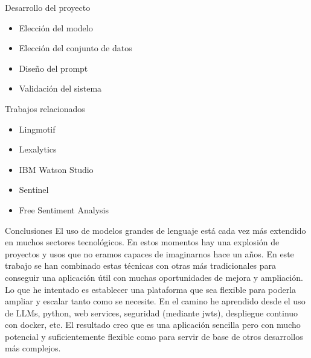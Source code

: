 \documentclass[aspectratio=169,xcolor=dvipsnames, t]{beamer}
\begin{document}
\begin{frame}{Desarrollo del proyecto}
    \begin{itemize}
        \item Elección del modelo
        \item Elección del conjunto de datos
        \item Diseño del prompt
        \item Validación del sistema
    \end{itemize}
\end{frame}


\begin{frame}{Trabajos relacionados}
    \begin{itemize}
        \item Lingmotif
        \item Lexalytics
        \item IBM Watson Studio
        \item Sentinel
        \item Free Sentiment Analysis   
    \end{itemize}
\end{frame}


\begin{frame}{Conclusiones}
    El uso de modelos grandes de lenguaje está cada vez más extendido en muchos sectores tecnológicos.
En estos momentos hay una explosión de proyectos y usos que no eramos capaces de imaginarnos hace un años.
En este trabajo se han combinado estas técnicas con otras más tradicionales para conseguir una aplicación 
útil con muchas oportunidades de mejora y ampliación.
Lo que he intentado es establecer una plataforma que sea flexible para poderla ampliar y escalar tanto como se necesite.
En el camino he aprendido desde el uso de LLMs, python, web services, seguridad (mediante jwts), 
despliegue continuo con docker, etc. El resultado creo que es una aplicación sencilla pero 
con mucho potencial y suficientemente flexible como para servir de base de otros desarrollos más complejos.
\end{frame}
\end{document}
